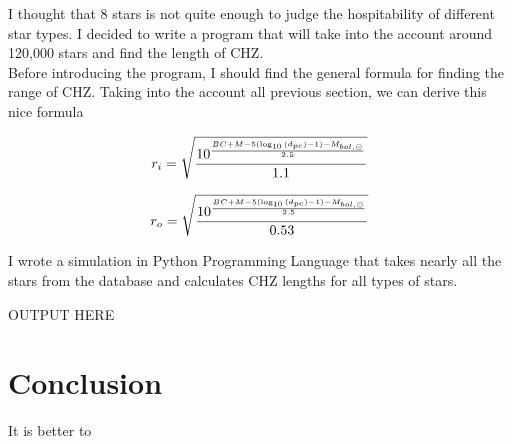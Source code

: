 \documentclass{article}
\begin{document}
I thought that 8 stars is not quite enough to judge the hospitability of different star types. I decided to write a program that will take into the account around 120,000 stars and find the length of CHZ.\\

Before introducing the program, I should find the general formula for finding the range of CHZ. Taking into the account all previous section, we can derive this nice formula

\begin{equation}
  r_i = \sqrt{\frac{10^{\frac{BC + M - 5(\log_{10}{(d_{pc})}-1) - M_{bol, \odot}} {2.5}}}{1.1}}\\
  \end{equation}

\begin{equation}
  r_o = \sqrt{\frac{10^{\frac{BC + M - 5(\log_{10}{(d_{pc})}-1) - M_{bol, \odot}} {2.5}}}{0.53}}\\
  \end{equation}

I wrote a simulation in Python Programming Language that takes nearly all the stars from the database and calculates CHZ lengths for all types of stars.

OUTPUT HERE

\section{Conclusion}

It is better to 





\newpage


  
\end{document}
